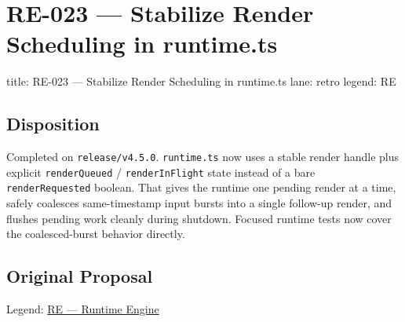 \chapter{RE-023 --- Stabilize Render Scheduling in runtime.ts}\label{record-379}

\smallskip

\begin{RecordMeta}
title: RE-023 — Stabilize Render Scheduling in runtime.ts
lane: retro
legend: RE

\end{RecordMeta}

\section{Disposition}\label{record-379-disposition}

Completed on \texttt{r\allowbreak{}e\allowbreak{}l\allowbreak{}e\allowbreak{}a\allowbreak{}s\allowbreak{}e\allowbreak{}/\allowbreak{}v\allowbreak{}4\allowbreak{}.\allowbreak{}5\allowbreak{}.\allowbreak{}0}. \texttt{r\allowbreak{}u\allowbreak{}n\allowbreak{}t\allowbreak{}i\allowbreak{}m\allowbreak{}e\allowbreak{}.\allowbreak{}t\allowbreak{}s} now uses a stable render handle plus explicit \texttt{r\allowbreak{}e\allowbreak{}n\allowbreak{}d\allowbreak{}e\allowbreak{}r\allowbreak{}Q\allowbreak{}u\allowbreak{}e\allowbreak{}u\allowbreak{}e\allowbreak{}d} / \texttt{r\allowbreak{}e\allowbreak{}n\allowbreak{}d\allowbreak{}e\allowbreak{}r\allowbreak{}I\allowbreak{}n\allowbreak{}F\allowbreak{}l\allowbreak{}i\allowbreak{}g\allowbreak{}h\allowbreak{}t} state instead of a bare \texttt{r\allowbreak{}e\allowbreak{}n\allowbreak{}d\allowbreak{}e\allowbreak{}r\allowbreak{}R\allowbreak{}e\allowbreak{}q\allowbreak{}u\allowbreak{}e\allowbreak{}s\allowbreak{}t\allowbreak{}e\allowbreak{}d} boolean. That gives the runtime one pending render at a time, safely coalesces same-timestamp input bursts into a single follow-up render, and flushes pending work cleanly during shutdown. Focused runtime tests now cover the coalesced-burst behavior directly.

\section{Original Proposal}\label{record-379-original-proposal}

Legend: \href{https://github.com/flyingrobots/bijou/blob/1853ad902f6bf219326409e7f743a5a1d6517dbc/docs/legends/RE-runtime-engine.md}{RE --- Runtime Engine}

